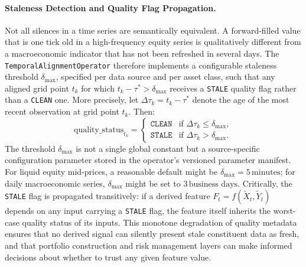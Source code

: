 \documentclass[12pt,openany]{book}
\numberwithin{equation}{chapter}
\theoremstyle{plain}
\theoremstyle{definition}
\theoremstyle{remark}
\begin{document}
\paragraph{Staleness Detection and Quality Flag Propagation.}
Not all silences in a time series are semantically equivalent. A forward-filled value that is one
tick old in a high-frequency equity series is qualitatively different from a macroeconomic
indicator that has not been refreshed in several days. The \texttt{TemporalAlignmentOperator}
therefore implements a configurable staleness threshold $\delta_{\max}$, specified per data
source and per asset class, such that any aligned grid point $t_k$ for which
$t_k - \tau^* > \delta_{\max}$ receives a \texttt{STALE} quality flag rather than a
\texttt{CLEAN} one. More precisely, let $\Delta\tau_k = t_k - \tau^*$ denote the age of the
most recent observation at grid point $t_k$. Then:
\begin{equation}
    \mathrm{quality\_status}_{t_k} =
    \begin{cases}
        \texttt{CLEAN}  & \text{if } \Delta\tau_k \leq \delta_{\max}, \\
        \texttt{STALE}  & \text{if } \Delta\tau_k > \delta_{\max}.
    \end{cases}
\end{equation}
The threshold $\delta_{\max}$ is not a single global constant but a source-specific configuration
parameter stored in the operator's versioned parameter manifest. For liquid equity mid-prices,
a reasonable default might be $\delta_{\max} = 5\,\text{minutes}$; for daily macroeconomic
series, $\delta_{\max}$ might be set to $3\,\text{business days}$. Critically, the \texttt{STALE}
flag is propagated transitively: if a derived feature $F_t = f(\tilde{X}_t, \tilde{Y}_t)$ depends
on any input carrying a \texttt{STALE} flag, the feature itself inherits the worst-case quality
status of its inputs. This monotone degradation of quality metadata ensures that no derived signal
can silently present stale constituent data as fresh, and that portfolio construction and risk
management layers can make informed decisions about whether to trust any given feature value.
\end{document}
